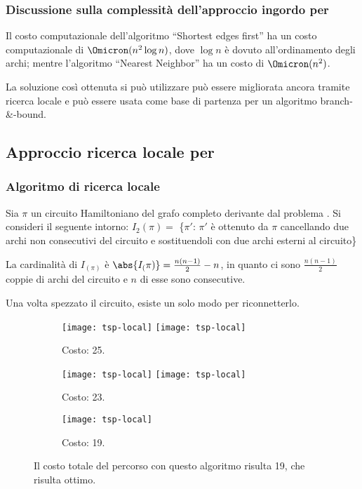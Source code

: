 \subsubsection{Discussione sulla complessità dell'approccio ingordo per {\tsp}}

Il costo computazionale dell'algoritmo \enquote{Shortest edges first} ha un costo computazionale di \(\Omicron(n^2 \log n)\), dove \(\log n\) è dovuto all'ordinamento degli archi; mentre l'algoritmo \enquote{Nearest Neighbor} ha un costo di \(\Omicron(n^2)\).

La soluzione così ottenuta si può utilizzare può essere migliorata ancora tramite ricerca locale e può essere usata come base di partenza per un algoritmo branch-\&-bound.

\subsection{Approccio ricerca locale per {\tsp}}

\subsubsection{Algoritmo di ricerca locale}

Sia \(\pi\) un circuito Hamiltoniano del grafo completo derivante dal problema {\tsp}.
Si consideri il seguente intorno:
\(I_2(\pi) =\) \{\(\pi'\): \(\pi'\) è ottenuto da \(\pi\) cancellando due archi non consecutivi del circuito e sostituendoli con due archi esterni al circuito\}

\begin{note}
La cardinalità di \(I_(\pi)\) è \(\abs{I_(\pi)} = \frac{n(n-1)}{2}-n\), in quanto ci sono \(\frac{n(n-1)}{2}\) coppie di archi del circuito e \(n\) di esse sono consecutive.

Una volta spezzato il circuito, esiste un solo modo per riconnetterlo.
\end{note}

\begin{figure}[H]\centering
	\begin{subfigure}[c]{.4\linewidth}\centering
		\texttt{[image: tsp-local]}\hfill
		\texttt{[image: tsp-local]}
		\caption{Costo: 25.}
	\end{subfigure}%
	\begin{subfigure}[c]{.4\linewidth}\centering
		\texttt{[image: tsp-local]}\hfill
		\texttt{[image: tsp-local]}
		\caption{Costo: 23.}
	\end{subfigure}%
	\begin{subfigure}[c]{.20\linewidth}\centering
		\texttt{[image: tsp-local]}
		\caption{Costo: 19.}
	\end{subfigure}%
	\caption[Applicazione dell'algoritmo di ricerca locale per {\tsp}]{Il costo totale del percorso con questo algoritmo risulta 19, che risulta ottimo.}
\end{figure}

